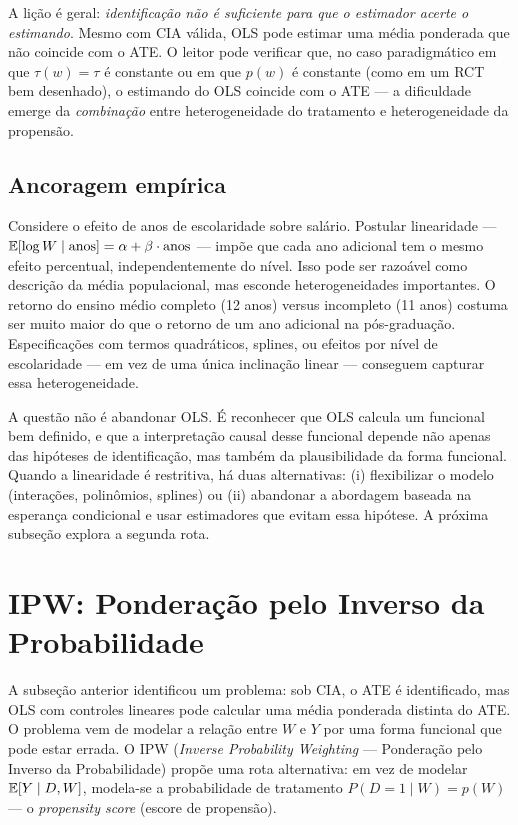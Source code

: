 A lição é geral: \textit{identificação não é suficiente para que o estimador acerte o estimando}. Mesmo com CIA válida, OLS pode estimar uma média ponderada que não coincide com o ATE. O leitor pode verificar que, no caso paradigmático em que $\tau(w) = \tau$ é constante ou em que $p(w)$ é constante (como em um RCT bem desenhado), o estimando do OLS coincide com o ATE --- a dificuldade emerge da \textit{combinação} entre heterogeneidade do tratamento e heterogeneidade da propensão.

\subsection*{Ancoragem empírica}

Considere o efeito de anos de escolaridade sobre salário. Postular linearidade --- $\mathbb{E}[\log W \mid \text{anos}] = \alpha + \beta \cdot \text{anos}$ --- impõe que cada ano adicional tem o mesmo efeito percentual, independentemente do nível. Isso pode ser razoável como descrição da média populacional, mas esconde heterogeneidades importantes. O retorno do ensino médio completo (12 anos) versus incompleto (11 anos) costuma ser muito maior do que o retorno de um ano adicional na pós-graduação. Especificações com termos quadráticos, splines, ou efeitos por nível de escolaridade --- em vez de uma única inclinação linear --- conseguem capturar essa heterogeneidade.

A questão não é abandonar OLS. É reconhecer que OLS calcula um funcional bem definido, e que a interpretação causal desse funcional depende não apenas das hipóteses de identificação, mas também da plausibilidade da forma funcional. Quando a linearidade é restritiva, há duas alternativas: (i) flexibilizar o modelo (interações, polinômios, splines) ou (ii) abandonar a abordagem baseada na esperança condicional e usar estimadores que evitam essa hipótese. A próxima subseção explora a segunda rota.


\section{IPW: Ponderação pelo Inverso da Probabilidade}
\label{subsec:ipw}

A subseção anterior identificou um problema: sob CIA, o ATE é identificado, mas OLS com controles lineares pode calcular uma média ponderada distinta do ATE. O problema vem de modelar a relação entre $W$ e $Y$ por uma forma funcional que pode estar errada. O IPW (\textit{Inverse Probability Weighting} --- Ponderação pelo Inverso da Probabilidade) propõe uma rota alternativa: em vez de modelar $\mathbb{E}[Y \mid D, W]$, modela-se a probabilidade de tratamento $P(D = 1 \mid W) = p(W)$ --- o \textit{propensity score} (escore de propensão).

